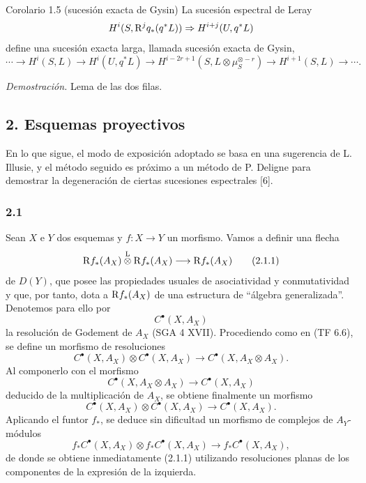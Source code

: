 \begin{statement}{Corolario 1.5 (sucesión exacta de Gysin)}
La sucesión espectral de Leray
\[
H^i(S,\mathrm{R}^j q_*(q^*L))\Rightarrow H^{i+j}(U,q^*L)
\]
define una sucesión exacta larga, llamada sucesión exacta de Gysin,
\[
\cdots\longrightarrow H^i(S,L)\longrightarrow H^i(U,q^*L)\longrightarrow
H^{i-2r+1}(S,L\otimes\mu_S^{\otimes -r})\longrightarrow H^{i+1}(S,L)\longrightarrow\cdots.
\]
\end{statement}

\emph{Demostración.} Lema de las dos filas.

\subsection*{2. Esquemas proyectivos}

En lo que sigue, el modo de exposición adoptado se basa en una sugerencia de L. Illusie, y el método seguido es próximo a un método de P. Deligne para demostrar la degeneración de ciertas sucesiones espectrales [6].

\subsubsection*{2.1}
Sean $X$ e $Y$ dos esquemas y $f:X\to Y$ un morfismo. Vamos a definir una flecha
\[
\mathrm{R} f_*(A_X)\overset{\mathrm L}{\otimes} \mathrm{R} f_*(A_X)\longrightarrow \mathrm{R} f_*(A_X)
\tag{2.1.1}
\]
de $D(Y)$, que posee las propiedades usuales de asociatividad y conmutatividad y que, por tanto, dota a $\mathrm{R} f_*(A_X)$ de una estructura de ``álgebra generalizada''. Denotemos para ello por
\[
C^{\bullet}(X,A_X)
\]
la resolución de Godement de $A_X$ (SGA 4 XVII). Procediendo como en (TF 6.6), se define un morfismo de resoluciones
\[
C^{\bullet}(X,A_X)\otimes C^{\bullet}(X,A_X)\longrightarrow C^{\bullet}(X,A_X\otimes A_X).
\]
Al componerlo con el morfismo
\[
C^{\bullet}(X,A_X\otimes A_X)\longrightarrow C^{\bullet}(X,A_X)
\]
deducido de la multiplicación de $A_X$, se obtiene finalmente un morfismo
\[
C^{\bullet}(X,A_X)\otimes C^{\bullet}(X,A_X)\longrightarrow C^{\bullet}(X,A_X).
\tag{2.1.2}
\]
Aplicando el funtor $f_*$, se deduce sin dificultad un morfismo de complejos de $A_Y$-módulos
\[
f_*C^{\bullet}(X,A_X)\otimes f_*C^{\bullet}(X,A_X)\longrightarrow f_*C^{\bullet}(X,A_X),
\]
de donde se obtiene inmediatamente (2.1.1) utilizando resoluciones planas de los componentes de la expresión de la izquierda.
